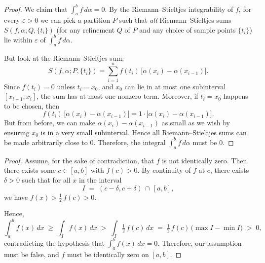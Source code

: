 \documentclass[11pt]{article}
\begin{document}
\begin{exercise}{6.1}
\begin{proof}
We claim that $\int_a^b f\,d\alpha = 0$.  By the Riemann--Stieltjes integrability of $f$, for every $\varepsilon>0$ we can pick a partition $P$ such that \emph{all} Riemann--Stieltjes sums $S(f,\alpha;Q,\{t_i\})$ (for any refinement $Q$ of $P$ and any choice of sample points $\{t_i\}$) lie within $\varepsilon$ of $\int_a^b f\,d\alpha$.  

But look at the Riemann--Stieltjes sum:
\[
S(f,\alpha;P,\{t_i\})
= \sum_{i=1}^n f(t_i)\,\bigl[\alpha(x_i)-\alpha(x_{i-1})\bigr].
\]
Since $f(t_i) = 0$ unless $t_i = x_0$, and $x_0$ can lie in at most one subinterval $[x_{i-1},x_i]$, the sum has at most one nonzero term.  Moreover, if $t_i=x_0$ happens to be chosen, then 
\[
f(t_i)\,\bigl[\alpha(x_i)-\alpha(x_{i-1})\bigr]
= 1\cdot\bigl[\alpha(x_i)-\alpha(x_{i-1})\bigr].
\]
But from before, we can make $\alpha(x_i)-\alpha(x_{i-1})$ as small as we wish by ensuring $x_0$ is in a very small subinterval.  Hence all Riemann--Stieltjes sums can be made arbitrarily close to $0$.  Therefore, the integral $\int_a^b f\,d\alpha$ must be $0$.
\end{proof}
\end{exercise}

\begin{exercise}{6.2}
    \begin{proof}
Assume, for the sake of contradiction, that $f$ is not identically zero.  
Then there exists some $c\in[a,b]$ with $f(c) > 0$.  
By continuity of $f$ at $c$, there exists $\delta>0$ such that for all $x$ in the interval 
\[
I \;=\; (c-\delta,c+\delta)\,\cap\,[a,b],
\]
we have $f(x) > \tfrac12\,f(c) > 0$.  

Hence,
\[
\int_a^b f(x)\,dx 
\;\ge\; 
\int_{I} f(x)\,dx 
\;>\;
\int_{I} \tfrac12\,f(c)\,dx 
\;=\;
\tfrac12\,f(c)\,\bigl(\max I - \min I\bigr)
\;>\;0,
\]
contradicting the hypothesis that $\int_a^b f(x)\,dx=0$.  
Therefore, our assumption must be false, and $f$ must be identically zero on $[a,b]$.
\end{proof}
\end{exercise}
\end{document}
